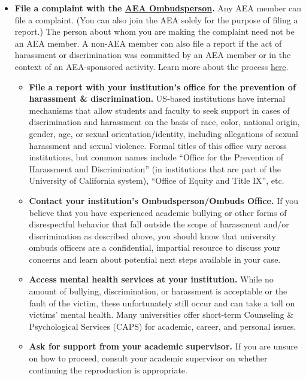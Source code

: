 \documentclass[]{book}
\providecommand{\tightlist}{%
  \setlength{\itemsep}{0pt}\setlength{\parskip}{0pt}}
\begin{document}
\begin{itemize}
\tightlist
\item
  \textbf{File a complaint with the \href{https://www.aeaweb.org/about-aea/aea-ombudsperson}{AEA Ombudsperson}.} Any AEA member can file a complaint. (You can also join the AEA solely for the purpose of filing a report.) The person about whom you are making the complaint need not be an AEA member. A non-AEA member can also file a report if the act of harassment or discrimination was committed by an AEA member or in the context of an AEA-sponsored activity. Learn more about the process \href{https://www.aeaweb.org/about-aea/aea-ombudsperson/faq}{here}.

  \begin{itemize}
  \tightlist
  \item
    \textbf{File a report with your institution's office for the prevention of harassment \& discrimination.} US-based institutions have internal mechanisms that allow students and faculty to seek support in cases of discrimination and harassment on the basis of race, color, national origin, gender, age, or sexual orientation/identity, including allegations of sexual harassment and sexual violence. Formal titles of this office vary across institutions, but common names include ``Office for the Prevention of Harassment and Discrimination'' (in institutions that are part of the University of California system), ``Office of Equity and Title IX'', etc.
  \item
    \textbf{Contact your institution's Ombudsperson/Ombuds Office.} If you believe that you have experienced academic bullying or other forms of disrespectful behavior that fall outside the scope of harassment and/or discrimination as described above, you should know that university ombuds officers are a confidential, impartial resource to discuss your concerns and learn about potential next steps available in your case.
  \item
    \textbf{Access mental health services at your institution.} While no amount of bullying, discrimination, or harassment is acceptable or the fault of the victim, these unfortunately still occur and can take a toll on victims' mental health. Many universities offer short-term Counseling \& Psychological Services (CAPS) for academic, career, and personal issues.
  \item
    \textbf{Ask for support from your academic supervisor.} If you are unsure on how to proceed, consult your academic supervisor on whether continuing the reproduction is appropriate.
  \end{itemize}
\end{itemize}
\end{document}
